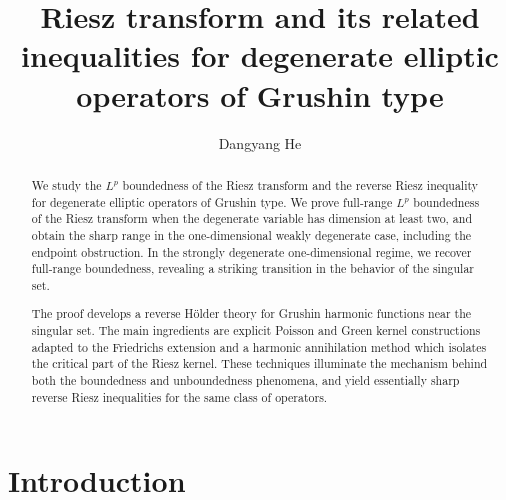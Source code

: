 \documentclass[12pt]{amsart}
\begin{document}
\title[Riesz transform on Grushin spaces]{Riesz transform and its related inequalities for degenerate elliptic operators of Grushin type}

\author{Dangyang He}  


\begin{abstract}

We study the $L^p$ boundedness of the Riesz transform and the reverse Riesz inequality for degenerate elliptic operators of Grushin type. We prove full-range $L^p$ boundedness of the Riesz transform when the degenerate variable has dimension at least two, and obtain the sharp range in the one-dimensional weakly degenerate case, including the endpoint obstruction. In the strongly degenerate one-dimensional regime, we recover full-range boundedness, revealing a striking transition in the behavior of the singular set.

The proof develops a reverse Hölder theory for Grushin harmonic functions near the singular set. The main ingredients are explicit Poisson and Green kernel constructions adapted to the Friedrichs extension and a harmonic annihilation method which isolates the critical part of the Riesz kernel. These techniques illuminate the mechanism behind both the boundedness and unboundedness phenomena, and yield essentially sharp reverse Riesz inequalities for the same class of operators.

\end{abstract}





\maketitle


 \tableofcontents






\section{Introduction}\label{section_1}
\end{document}
